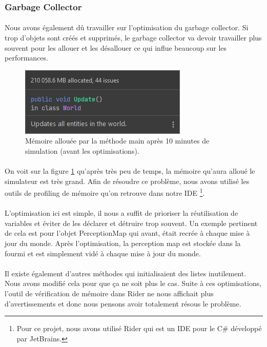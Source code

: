 \documentclass{EPUProjetDi}
\begin{document}
\subsubsection{Garbage Collector}
\paragraph{}
Nous avons également dû travailler sur l'optimisation du garbage collector. Si trop d'objets sont créés et supprimés, le garbage collector va devoir travailler plus souvent pour les allouer et les désallouer
ce qui influe beaucoup sur les performances.  

\begin{figure}[h]
    \centering
    \includegraphics[scale=1]{garbage_collector.png}
    \caption{Mémoire allouée par la méthode main après 10 minutes de simulation (avant les optimisations).}
    \label{fig:garbage_collector}
\end{figure}

\paragraph{}
On voit sur la figure \ref{fig:garbage_collector} qu'après très peu de temps, la mémoire qu'aura alloué le simulateur est très grand.
Afin de résoudre ce problème, nous avons utilisé les outils de profiling de mémoire qu'on retrouve dans notre IDE
\footnote{Pour ce projet, nous avons utilisé Rider qui est un IDE pour le C\# développé par JetBrains.}.
\paragraph{}
L'optimisation ici est simple, il nous a suffit de prioriser la réutilisation de variables et éviter de les déclarer et détruire trop souvent.
Un exemple pertinent de cela est pour l'objet PerceptionMap qui avant, était recrée à chaque mise à jour du monde. Après l'optimisation, la perception map est stockée dans la fourmi
et est simplement vidé à chaque mise à jour du monde. 
\paragraph{}
Il existe également d'autres méthodes qui initialisaient des listes inutilement. Nous avons modifié cela pour que ça ne soit plus le cas.
Suite à ces optimisations, l'outil de vérification de mémoire dans Rider ne nous affichait plus d'avertissements et donc nous pensons avoir totalement résous le problème.
\end{document}
